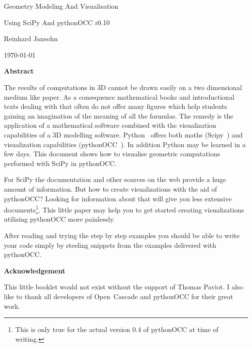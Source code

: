\documentclass[12pt,a4paper,twoside]{article}
\begin{document}
\begin{titlepage}
\begin{center}
{
\large 
Geometry Modeling And Visualisation 

\vspace*{0.3cm}
Using SciPy And pythonOCC r0.10
}

{

\vspace*{0.75cm}
Reinhard Jansohn

\vspace{0.5cm}
\today
}
\end{center}
{

\vspace*{0.75cm}
{\small
\begin{center}
{\bf Abstract}
\end{center}
The results of computations in 3D cannot be drawn easily on a two dimensional medium like paper.
As a consequence mathematical books and introductional texts dealing with that often do not offer many figures which help students gaining an imagination of the meaning of all the formulas.
The remedy is the application of a mathematical software combined with the visualization capabilities of a 3D modelling software.
Python~\cite{PYTHON_ORG} offers both maths (Scipy~\cite{SCIPY_ORG}) and visualization capabilities (pythonOCC~\cite{PYTHONOCC_ORG}). 
In addition Python may be learned in a few days.
This document shows how to visualise geometric computations performed with SciPy in pythonOCC.

For SciPy the documentation and other sources on the web provide a huge amount of information.
But how to create visualizations with the aid of pythonOCC? 
Looking for information about that will give you less extensive documents\footnote{This is only true for the actual version 0.4 of pythonOCC at time of writing.}.
This little paper may help you to get started creating visualizations utilising pythonOCC more painlessly.

After reading and trying the step by step examples you should be able to write your code simply by steeling snippets from the examples delivered with pythonOCC.

\begin{center}
{\bf Acknowledgement}
\end{center}
This little booklet would not exist without the support of Thomas Paviot. I also like to thank all developers of Open~Cascade and pythonOCC for their great work.
}
}
\end{titlepage}




\tableofcontents




%
\appendix



\end{document}
